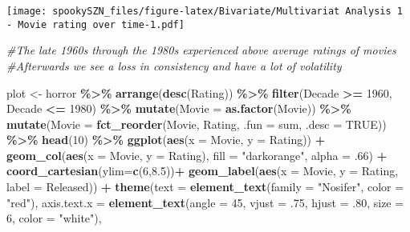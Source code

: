 \documentclass[
]{article}
\newenvironment{Shaded}{\begin{snugshade}}{\end{snugshade}}
\newcommand{\AttributeTok}[1]{\textcolor[rgb]{0.13,0.29,0.53}{#1}}
\newcommand{\CommentTok}[1]{\textcolor[rgb]{0.56,0.35,0.01}{\textit{#1}}}
\newcommand{\ConstantTok}[1]{\textcolor[rgb]{0.56,0.35,0.01}{#1}}
\newcommand{\DecValTok}[1]{\textcolor[rgb]{0.00,0.00,0.81}{#1}}
\newcommand{\FloatTok}[1]{\textcolor[rgb]{0.00,0.00,0.81}{#1}}
\newcommand{\FunctionTok}[1]{\textcolor[rgb]{0.13,0.29,0.53}{\textbf{#1}}}
\newcommand{\NormalTok}[1]{#1}
\newcommand{\OtherTok}[1]{\textcolor[rgb]{0.56,0.35,0.01}{#1}}
\newcommand{\SpecialCharTok}[1]{\textcolor[rgb]{0.81,0.36,0.00}{\textbf{#1}}}
\newcommand{\StringTok}[1]{\textcolor[rgb]{0.31,0.60,0.02}{#1}}
\begin{document}
\texttt{[image: spookySZN\_files/figure-latex/Bivariate/Multivariat Analysis 1 - Movie rating over time-1.pdf]}

\begin{Shaded}
\begin{Highlighting}[]
\CommentTok{\#The late 1960s through the 1980s experienced above average ratings of movies }
\CommentTok{\#Afterwards we see a loss in consistency and have a lot of volatility}

\NormalTok{plot }\OtherTok{\textless{}{-}}\NormalTok{ horror }\SpecialCharTok{\%\textgreater{}\%} 
  \FunctionTok{arrange}\NormalTok{(}\FunctionTok{desc}\NormalTok{(Rating)) }\SpecialCharTok{\%\textgreater{}\%} 
  \FunctionTok{filter}\NormalTok{(Decade }\SpecialCharTok{\textgreater{}=} \DecValTok{1960}\NormalTok{, Decade }\SpecialCharTok{\textless{}=} \DecValTok{1980}\NormalTok{) }\SpecialCharTok{\%\textgreater{}\%} 
  \FunctionTok{mutate}\NormalTok{(}\AttributeTok{Movie =} \FunctionTok{as.factor}\NormalTok{(Movie)) }\SpecialCharTok{\%\textgreater{}\%} 
  \FunctionTok{mutate}\NormalTok{(}\AttributeTok{Movie =} \FunctionTok{fct\_reorder}\NormalTok{(Movie, Rating, }\AttributeTok{.fun =}\NormalTok{ sum, }\AttributeTok{.desc =} \ConstantTok{TRUE}\NormalTok{)) }\SpecialCharTok{\%\textgreater{}\%} 
  \FunctionTok{head}\NormalTok{(}\DecValTok{10}\NormalTok{) }\SpecialCharTok{\%\textgreater{}\%} 
  \FunctionTok{ggplot}\NormalTok{(}\FunctionTok{aes}\NormalTok{(}\AttributeTok{x =}\NormalTok{ Movie, }\AttributeTok{y =}\NormalTok{ Rating)) }\SpecialCharTok{+}
  \FunctionTok{geom\_col}\NormalTok{(}\FunctionTok{aes}\NormalTok{(}\AttributeTok{x =}\NormalTok{ Movie, }\AttributeTok{y =}\NormalTok{ Rating), }\AttributeTok{fill =} \StringTok{"darkorange"}\NormalTok{,  }\AttributeTok{alpha =}\NormalTok{ .}\DecValTok{66}\NormalTok{) }\SpecialCharTok{+}
 \FunctionTok{coord\_cartesian}\NormalTok{(}\AttributeTok{ylim=}\FunctionTok{c}\NormalTok{(}\DecValTok{6}\NormalTok{,}\FloatTok{8.5}\NormalTok{))}\SpecialCharTok{+}
  \FunctionTok{geom\_label}\NormalTok{(}\FunctionTok{aes}\NormalTok{(}\AttributeTok{x =}\NormalTok{ Movie, }\AttributeTok{y =}\NormalTok{ Rating, }\AttributeTok{label =}\NormalTok{ Released)) }\SpecialCharTok{+} 
  \FunctionTok{theme}\NormalTok{(}\AttributeTok{text =} \FunctionTok{element\_text}\NormalTok{(}\AttributeTok{family =} \StringTok{"Nosifer"}\NormalTok{, }\AttributeTok{color =} \StringTok{"red"}\NormalTok{),}
    \AttributeTok{axis.text.x =} \FunctionTok{element\_text}\NormalTok{(}\AttributeTok{angle =} \DecValTok{45}\NormalTok{, }\AttributeTok{vjust =}\NormalTok{ .}\DecValTok{75}\NormalTok{, }\AttributeTok{hjust =}\NormalTok{ .}\DecValTok{80}\NormalTok{, }\AttributeTok{size =} \DecValTok{6}\NormalTok{, }\AttributeTok{color =} \StringTok{"white"}\NormalTok{),}

\end{Highlighting}
\end{Shaded}
\end{document}
